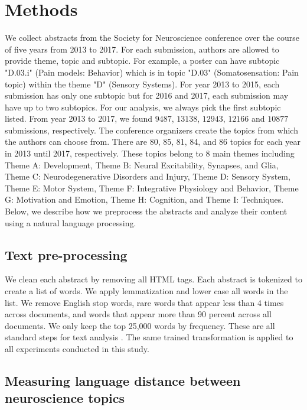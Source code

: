 \documentclass[10pt,letterpaper]{article}
\begin{document}
\section*{Methods}

We collect abstracts from the Society for Neuroscience conference over the course of five years from 2013 to 2017. For each submission, authors are allowed to provide theme, topic and subtopic. For example, a poster can have subtopic "D.03.i" (Pain models: Behavior) which is in topic "D.03" (Somatosensation: Pain topic) within the theme "D" (Sensory Systems). For year 2013 to 2015, each submission has only one subtopic but for 2016 and 2017, each submission may have up to two subtopics. For our analysis, we always pick the first subtopic listed. From year 2013 to 2017, we found $9487$, $13138$, $12943$, $12166$ and $10877$ submissions, respectively. The conference organizers create the topics from which the authors can choose from. There are 80, 85, 81, 84, and 86 topics for each year in 2013 until 2017, respectively. These topics belong to 8 main themes including Theme A: Development, Theme B: Neural Excitability, Synapses, and Glia, Theme C: Neurodegenerative Disorders and Injury, Theme D: Sensory System, Theme E: Motor System, Theme F: Integrative Physiology and Behavior, Theme G: Motivation and Emotion, Theme H: Cognition, and Theme I: Techniques. Below, we describe how we preprocess the abstracts and analyze their content using a natural language processing.


\subsection*{Text pre-processing}

We clean each abstract by removing all HTML tags. Each abstract is tokenized to create a list of words. We apply lemmatization and lower case all words in the list. We remove English stop words, rare words that appear less than 4 times across documents, and words that appear more than 90 percent across all documents. We only keep the top 25,000 words by frequency. These are all standard steps for text analysis \cite{manning2009introduction}. The same trained transformation is applied to all experiments conducted in this study.

\subsection*{Measuring language distance between neuroscience topics}
\end{document}
